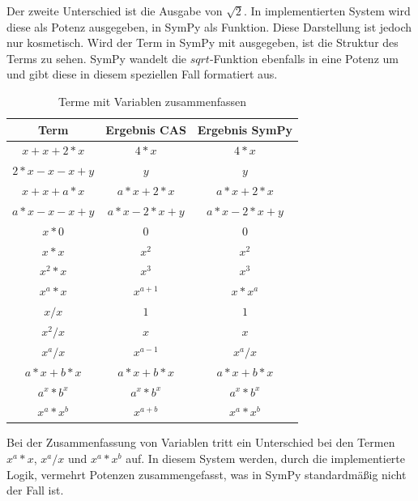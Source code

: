 \documentclass[11pt,a4paper, ngerman]{article}
\begin{document}
Der zweite Unterschied ist die Ausgabe von $\sqrt{2}$. In implementierten System wird diese als Potenz ausgegeben, in SymPy als Funktion. Diese Darstellung ist jedoch nur kosmetisch. Wird der Term in SymPy mit  ausgegeben, ist die Struktur des Terms zu sehen. SymPy wandelt die $sqrt$-Funktion ebenfalls in eine Potenz um und gibt diese in diesem speziellen Fall formatiert aus.

\newpage

\begin{table}[ht!]
    \caption{Terme mit Variablen zusammenfassen}
    \centering
    \begin{tabular}{|c|c|c|}
        \hline
        \textbf{Term} & \textbf{Ergebnis CAS} & \textbf{Ergebnis SymPy} \\
        \hline
        $x+x+2*x$ & $4*x$ & $4*x$ \\
        \hline
        $2*x-x-x+y$ & $y$ & $y$ \\
        \hline
        $x+x+a*x$ & $a*x+2*x$ & $a*x + 2*x$ \\
        \hline
        $a*x-x-x+y$ & $a*x-2*x+y$ & $a*x - 2*x + y$ \\
        \hline
        $x*0$ & $0$ & $0$ \\
        \hline
        $x*x$ & $x^2$ & $x^2$ \\
        \hline
        $x^2*x$ & $x^3$ & $x^3$ \\
        \hline
        $x^a*x$ & $x^{a+1}$ & $x*x^a$ \\
        \hline
        $x/x$ & $1$ & $1$ \\
        \hline
        $x^2/x$ & $x$ & $x$ \\
        \hline
        $x^a/x$ & $x^{a-1}$ & $x^a/x$ \\
        \hline
        $a*x+b*x$ & $a*x+b*x$ & $a*x+b*x$ \\
        \hline
        $a^x*b^x$ & $a^x*b^x$ & $a^x*b^x$ \\
        \hline
        $x^a*x^b$ & $x^{a+b}$ & $x^a*x^b$ \\
        \hline
    \end{tabular}
\end{table}

Bei der Zusammenfassung von Variablen tritt ein Unterschied bei den Termen $x^a*x$, $x^a/x$ und $x^a*x^b$ auf. In diesem System werden, durch die implementierte Logik, vermehrt Potenzen zusammengefasst, was in SymPy standardmäßig nicht der Fall ist.
\end{document}
